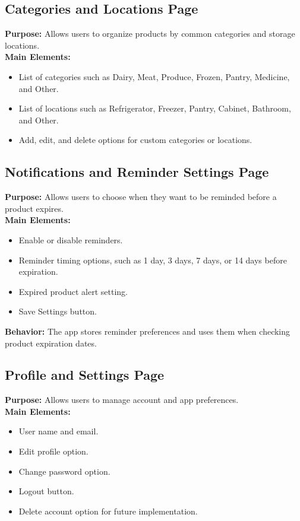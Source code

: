 \documentclass[12pt]{article}
\begin{document}
\subsection{Categories and Locations Page}
\textbf{Purpose:} Allows users to organize products by common categories and storage locations.\\
\textbf{Main Elements:}
\begin{itemize}[leftmargin=*]
    \item List of categories such as Dairy, Meat, Produce, Frozen, Pantry, Medicine, and Other.
    \item List of locations such as Refrigerator, Freezer, Pantry, Cabinet, Bathroom, and Other.
    \item Add, edit, and delete options for custom categories or locations.
\end{itemize}

\subsection{Notifications and Reminder Settings Page}
\textbf{Purpose:} Allows users to choose when they want to be reminded before a product expires.\\
\textbf{Main Elements:}
\begin{itemize}[leftmargin=*]
    \item Enable or disable reminders.
    \item Reminder timing options, such as 1 day, 3 days, 7 days, or 14 days before expiration.
    \item Expired product alert setting.
    \item Save Settings button.
\end{itemize}
\textbf{Behavior:} The app stores reminder preferences and uses them when checking product expiration dates.

\subsection{Profile and Settings Page}
\textbf{Purpose:} Allows users to manage account and app preferences.\\
\textbf{Main Elements:}
\begin{itemize}[leftmargin=*]
    \item User name and email.
    \item Edit profile option.
    \item Change password option.
    \item Logout button.
    \item Delete account option for future implementation.
\end{itemize}
\end{document}
